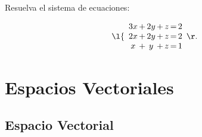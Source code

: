 \documentclass[compacto,10pt]{pubciencias-notas}
\begin{document}
\begin{ejer}
    Resuelva el sistema de ecuaciones:

     \[
        \l\{
        \begin{array}{c@{\,}c@{\,}c@{\,}c@{\,}c@{\,}c@{\,}c}
        3x  & + & 2y & + & z &= & 2 \\
        2x  & + & 2y & + & z &= & 2\\
        x  & + & y & + & z &= & 1
        \end{array}
        \r.
    \]
\end{ejer}

\setcounter{section}{3}
\section{Espacios Vectoriales}
\subsection{Espacio Vectorial}
\end{document}
